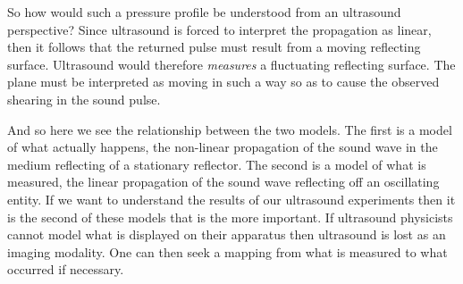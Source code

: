 So how would such a pressure profile be understood from an ultrasound perspective?
Since ultrasound is forced to interpret the propagation as linear,
then it follows that the returned pulse must result from a moving reflecting surface.
Ultrasound would therefore  {\em measures} a fluctuating reflecting surface.
The plane must be interpreted as moving in such a way so as to cause the observed shearing in the sound pulse.

And so here we see the relationship between the two models.
The first is a model of what actually happens,
the non-linear propagation of the sound wave in the medium reflecting of a stationary reflector.
The second is a model of what is measured,
the linear propagation of the sound wave reflecting off an oscillating entity.
If we want to understand the results of our ultrasound experiments then it is the second of these models that is the more important.
%
If ultrasound physicists cannot model what is displayed on their apparatus then ultrasound is lost as an imaging modality.
One can then seek a mapping from what is measured to what occurred if necessary.
%

